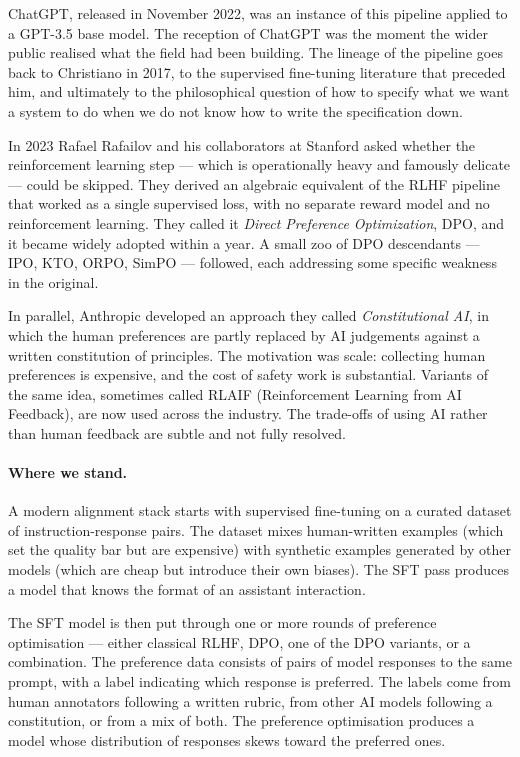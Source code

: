 ChatGPT, released in November 2022, was an instance of this
pipeline applied to a GPT-3.5 base model. The reception of
ChatGPT was the moment the wider public realised what the
field had been building. The lineage of the pipeline goes back
to Christiano in 2017, to the supervised fine-tuning literature
that preceded him, and ultimately to the philosophical question
of how to specify what we want a system to do when we do not
know how to write the specification down.

In 2023 Rafael Rafailov and his collaborators at Stanford
asked whether the reinforcement learning step --- which is
operationally heavy and famously delicate --- could be
skipped. They derived an algebraic equivalent of the RLHF
pipeline that worked as a single supervised loss, with no
separate reward model and no reinforcement learning. They
called it \emph{Direct Preference Optimization}, DPO, and it
became widely adopted within a year. A small zoo of DPO
descendants --- IPO, KTO, ORPO, SimPO --- followed, each
addressing some specific weakness in the original.

In parallel, Anthropic developed an approach they called
\emph{Constitutional AI}, in which the human preferences are
partly replaced by AI judgements against a written constitution
of principles. The motivation was scale: collecting human
preferences is expensive, and the cost of safety work is
substantial. Variants of the same idea, sometimes called
RLAIF (Reinforcement Learning from AI Feedback), are now used
across the industry. The trade-offs of using AI rather than
human feedback are subtle and not fully resolved.

\paragraph{Where we stand.} A modern alignment stack starts with supervised fine-tuning on
a curated dataset of instruction-response pairs. The dataset
mixes human-written examples (which set the quality bar but
are expensive) with synthetic examples generated by other
models (which are cheap but introduce their own biases). The
SFT pass produces a model that knows the format of an
assistant interaction.

The SFT model is then put through one or more rounds of
preference optimisation --- either classical RLHF, DPO, one of
the DPO variants, or a combination. The preference data
consists of pairs of model responses to the same prompt, with
a label indicating which response is preferred. The labels
come from human annotators following a written rubric, from
other AI models following a constitution, or from a mix of
both. The preference optimisation produces a model whose
distribution of responses skews toward the preferred ones.

